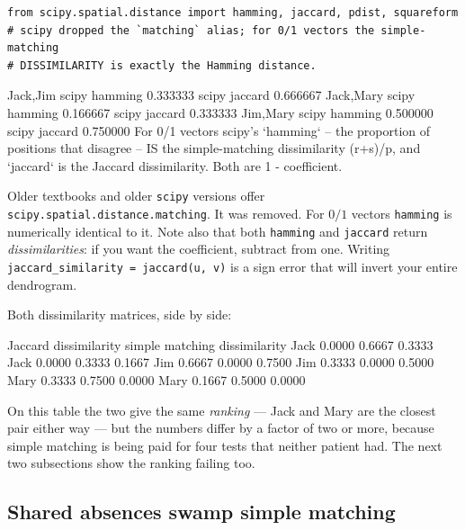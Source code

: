 \documentclass[11pt]{article}
\begin{document}
\begin{lstlisting}
from scipy.spatial.distance import hamming, jaccard, pdist, squareform
# scipy dropped the `matching` alias; for 0/1 vectors the simple-matching
# DISSIMILARITY is exactly the Hamming distance.
\end{lstlisting}
\begin{codeout}
Jack,Jim     scipy hamming 0.333333   scipy jaccard 0.666667
Jack,Mary    scipy hamming 0.166667   scipy jaccard 0.333333
Jim,Mary     scipy hamming 0.500000   scipy jaccard 0.750000
For 0/1 vectors scipy's `hamming` -- the proportion of positions
that disagree -- IS the simple-matching dissimilarity (r+s)/p, and
`jaccard` is the Jaccard dissimilarity.  Both are 1 - coefficient.
\end{codeout}

\begin{caution}
Older textbooks and older \texttt{scipy} versions offer
\texttt{scipy.spatial.distance.matching}. It was removed. For $0/1$ vectors
\texttt{hamming} is numerically identical to it. Note also that both
\texttt{hamming} and \texttt{jaccard} return \emph{dissimilarities}: if you
want the coefficient, subtract from one. Writing
\texttt{jaccard\_similarity = jaccard(u, v)} is a sign error that will
invert your entire dendrogram.
\end{caution}

Both dissimilarity matrices, side by side:

\begin{codeout}
Jaccard dissimilarity              simple matching dissimilarity
Jack   0.0000  0.6667  0.3333       Jack   0.0000  0.3333  0.1667
Jim    0.6667  0.0000  0.7500       Jim    0.3333  0.0000  0.5000
Mary   0.3333  0.7500  0.0000       Mary   0.1667  0.5000  0.0000
\end{codeout}

On this table the two give the same \emph{ranking} --- Jack and Mary are the
closest pair either way --- but the numbers differ by a factor of two or
more, because simple matching is being paid for four tests that neither
patient had. The next two subsections show the ranking failing too.

\subsection{Shared absences swamp simple matching}
\label{sec:swamp}
\end{document}
